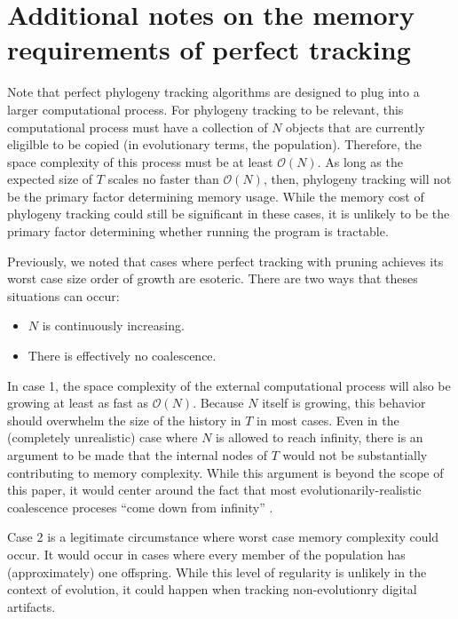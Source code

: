 \section{Additional notes on the memory requirements of perfect tracking} \label{sec:perfect-tracking-space-supp}

Note that perfect phylogeny tracking algorithms are designed to plug into a larger computational process.
For phylogeny tracking to be relevant, this computational process must have a collection of $N$ objects that are currently eligilble to be copied (in evolutionary terms, the population).
Therefore, the space complexity of this process must be at least $\mathcal{O}(N)$.
As long as the expected size of $T$ scales no faster than $\mathcal{O}(N)$, then, phylogeny tracking will not be the primary factor determining memory usage.
While the memory cost of phylogeny tracking could still be significant in these cases, it is unlikely to be the primary factor determining whether running the program is tractable.

Previously, we noted that cases where perfect tracking with pruning achieves its worst case size order of growth are esoteric.
There are two ways that theses situations can occur:

\begin{itemize}
\item $N$ is continuously increasing.
\item There is effectively no coalescence.
\end{itemize}

In case 1, the space complexity of the external computational process will also be growing at least as fast as $\mathcal{O}(N)$.
Because $N$ itself is growing, this behavior should overwhelm the size of the history in $T$ in most cases.
Even in the (completely unrealistic) case where $N$ is allowed to reach infinity, there is an argument to be made that the internal nodes of $T$ would not be substantially contributing to memory complexity.
While this argument is beyond the scope of this paper, it would center around the fact that most evolutionarily-realistic coalescence proceses ``come down from infinity'' \citep{berestyckiRecentProgressCoalescent2009}.

Case 2 is a legitimate circumstance where worst case memory complexity could occur. 
It would occur in cases where every member of the population has (approximately) one offspring.
While this level of regularity is unlikely in the context of evolution, it could happen when tracking non-evolutionry digital artifacts.